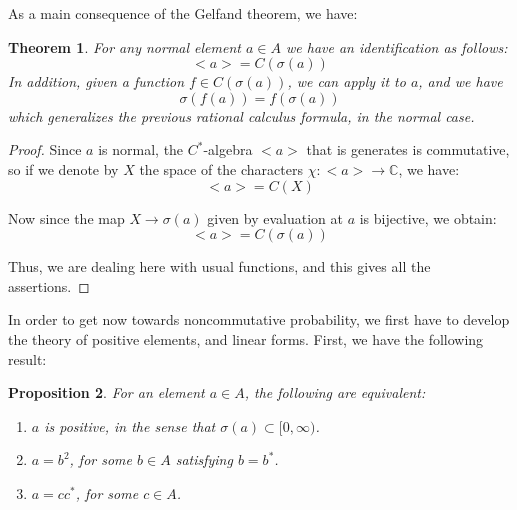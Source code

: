 \documentclass[12pt]{amsbook}
\newtheorem{theorem}{Theorem}[chapter]
\newtheorem{proposition}[theorem]{Proposition}
\begin{document}
As a main consequence of the Gelfand theorem, we have:


\begin{theorem}
For any normal element $a\in A$ we have an identification as follows:
$$<a>=C(\sigma(a))$$
In addition, given a function $f\in C(\sigma(a))$, we can apply it to $a$, and we have
$$\sigma(f(a))=f(\sigma(a))$$
which generalizes the previous rational calculus formula, in the normal case.
\end{theorem}

\begin{proof}
Since $a$ is normal, the $C^*$-algebra $<a>$ that is generates is commutative, so if we denote by $X$ the space of the characters $\chi:<a>\to\mathbb C$, we have:
$$<a>=C(X)$$

Now since the map $X\to\sigma(a)$ given by evaluation at $a$ is bijective, we obtain:
$$<a>=C(\sigma(a))$$

Thus, we are dealing here with usual functions, and this gives all the assertions.
\end{proof}

In order to get now towards noncommutative probability, we first have to develop the theory of positive elements, and linear forms. First, we have the following result:


\begin{proposition}
For an element $a\in A$, the following are equivalent:
\begin{enumerate}
\item $a$ is positive, in the sense that $\sigma(a)\subset[0,\infty)$.

\item $a=b^2$, for some $b\in A$ satisfying $b=b^*$.

\item $a=cc^*$, for some $c\in A$.
\end{enumerate}
\end{proposition}
\end{document}
